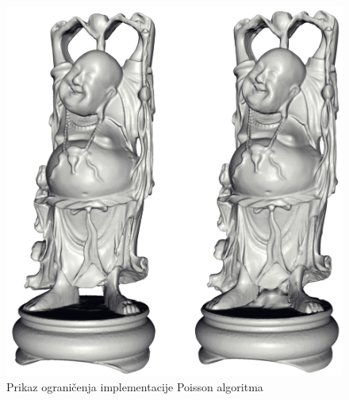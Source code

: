 \begin{figure}[h]
\centering
\includegraphics[scale=0.20]{figures/poisson-buddha.png}
\caption[]{Prikaz ograničenja implementacije Poisson
algoritma\footnotemark[1]}
\label{fig:poisson-buddha.png}
\end{figure}























